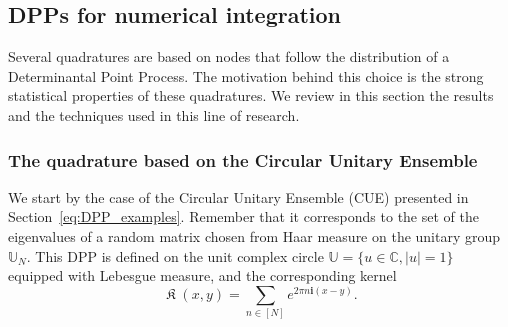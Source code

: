 \documentclass[twoside,11pt]{book}
\newtheorem{proposition}{Proposition}
\newtheorem{definition}{Definition}
\numberwithin{theorem}{chapter}
\numberwithin{definition}{chapter}
\numberwithin{proposition}{chapter}
\numberwithin{corollary}{chapter}
\numberwithin{example}{chapter}
\numberwithin{lemma}{chapter}
\numberwithin{assumption}{chapter}
\DeclareMathOperator*{\KDPP}{\mathfrak{K}}
\begin{document}











\subsection{DPPs for numerical integration}
Several quadratures are based on nodes that follow the distribution of a Determinantal Point Process. The motivation behind this choice is the strong statistical properties of these quadratures. We review in this section the results and the techniques used in this line of research. 

\subsubsection{The quadrature based on the Circular Unitary Ensemble}
We start by the case of the Circular Unitary Ensemble (CUE) presented in Section~\ref{eq:DPP_examples}. Remember that it corresponds to the set of the eigenvalues of a random matrix chosen from Haar measure on the unitary group $\mathbb{U}_{N}$. This DPP is defined on the unit complex circle $\mathbb{U} = \{ u \in \mathbb{C}, |u| =1 \}$ equipped with Lebesgue measure, and the corresponding kernel
\begin{equation}
\KDPP(x,y) = \sum\limits_{n \in [N]} e^{2 \pi n \mathbf{i}(x-y)}.
\end{equation}  
\end{document}
